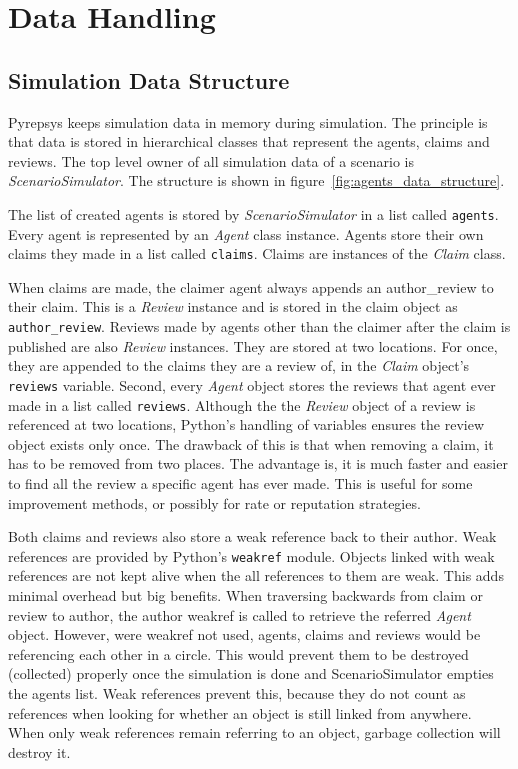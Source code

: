 \documentclass[%
    ]{\PathToTumTemplate/thesis/tum_thesis}
\begin{document}
\section{Data Handling}\label{sec:impl_data}


\subsection{Simulation Data Structure}
Pyrepsys keeps simulation data in memory during simulation.
The principle is that data is stored in hierarchical classes that represent the agents, claims and reviews.
The top level owner of all simulation data of a scenario is \emph{ScenarioSimulator}.
The structure is shown in figure~\ref{fig:agents_data_structure}.

The list of created agents is stored by \emph{ScenarioSimulator} in a list called \texttt{agents}.
Every agent is represented by an \emph{Agent} class instance.
Agents store their own claims they made in a list called \texttt{claims}.
Claims are instances of the \emph{Claim} class.

When claims are made, the claimer agent always appends an \gls{author_review} to their claim.
This is a \emph{Review} instance and is stored in the claim object as \texttt{author\_review}.
Reviews made by agents other than the claimer after the claim is published are also \emph{Review} instances.
They are stored at two locations.
For once, they are appended to the claims they are a review of, in the \emph{Claim} object's \texttt{reviews} variable.
Second, every \emph{Agent} object stores the reviews that agent ever made in a list called \texttt{reviews}.
Although the the \emph{Review} object of a review is referenced at two locations, Python's handling of variables ensures the review object exists only once.
The drawback of this is that when removing a claim, it has to be removed from two places.
The advantage is, it is much faster and easier to find all the review a specific agent has ever made.
This is useful for some improvement methods, or possibly for rate or reputation strategies.

Both claims and reviews also store a weak reference back to their author.
Weak references are provided by Python's \texttt{weakref} module.
Objects linked with weak references are not kept alive when the all references to them are weak.
This adds minimal overhead but big benefits.
When traversing backwards from claim or review to author, the author weakref is called to retrieve the referred \emph{Agent} object.
However, were weakref not used, agents, claims and reviews would be referencing each other in a circle.
This would prevent them to be destroyed (collected) properly once the simulation is done and ScenarioSimulator empties the agents list.
Weak references prevent this, because they do not count as references when looking for whether an object is still linked from anywhere.
When only weak references remain referring to an object, garbage collection will destroy it.
\end{document}

